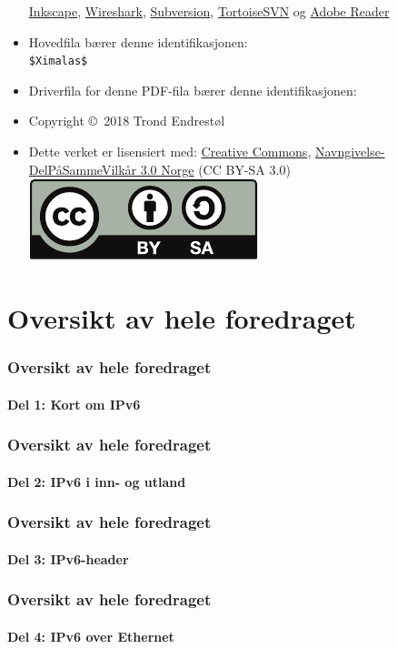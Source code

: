 \begin{frame}[allowframebreaks]
\begin{itemize}
    \href{http://www.inkscape.org/en/}{Inkscape},
    \href{http://www.wireshark.org/}{Wireshark},
    \href{http://subversion.apache.org/}{Subversion},
    \href{http://tortoisesvn.net/}{TortoiseSVN} og
    \href{http://get.adobe.com/no/reader/}{Adobe Reader}
  \item Hovedfila bærer denne identifikasjonen:\\
    \texttt{\$${}$Ximalas${}$\$}
  \item Driverfila for denne PDF-fila bærer denne identifikasjonen:\\
    \svndriverfil
  \item Copyright \copyright\ 2018 Trond Endrestøl
  \item Dette verket er lisensiert med:
    \href{http://creativecommons.org/}{Creative Commons},
    \href{http://creativecommons.org/licenses/by-sa/3.0/no/}{Navngivelse-DelPåSammeVilkår
      3.0 Norge} (CC BY-SA
    3.0)\hfill\includegraphics[scale=.25]{by-sa.pdf}
  \end{itemize}
\end{frame}

\section*{Oversikt av hele foredraget}
\begin{frame}
  \frametitle{Oversikt av hele foredraget}
  \framesubtitle{Del 1: Kort om IPv6}
  \tableofcontents[part=1]
\end{frame}

\begin{frame}
  \frametitle{Oversikt av hele foredraget}
  \framesubtitle{Del 2: IPv6 i inn- og utland}
  \tableofcontents[part=2]
\end{frame}

\begin{frame}
  \frametitle{Oversikt av hele foredraget}
  \framesubtitle{Del 3: IPv6-header}
  \tableofcontents[part=3]
\end{frame}

\begin{frame}
  \frametitle{Oversikt av hele foredraget}
  \framesubtitle{Del 4: IPv6 over Ethernet}
  \tableofcontents[part=4]
\end{frame}

